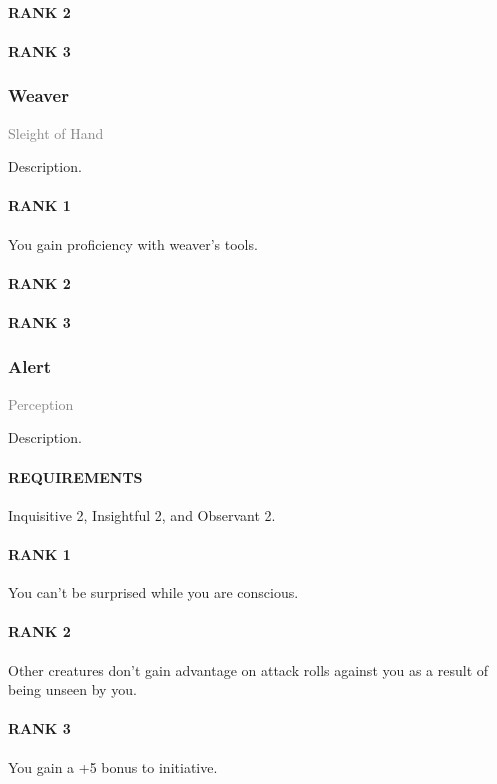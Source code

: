 \paragraph{RANK 2}
\paragraph{RANK 3}

\subsubsection{Weaver} \label{feat::weaver}
\small{\textcolor{gray}{Sleight of Hand}}

\normalsize
Description.
\paragraph{RANK 1} You gain proficiency with weaver's tools.
\paragraph{RANK 2}
\paragraph{RANK 3}

\subsubsection{Alert} \label{feat::alert}
\small{\textcolor{gray}{Perception}}

\normalsize
Description.
\paragraph{REQUIREMENTS} Inquisitive 2, Insightful 2, and Observant 2.
\paragraph{RANK 1} You can't be surprised while you are conscious.
\paragraph{RANK 2} Other creatures don't gain advantage on attack rolls against you as a result of being unseen by you.
\paragraph{RANK 3} You gain a +5 bonus to initiative.

